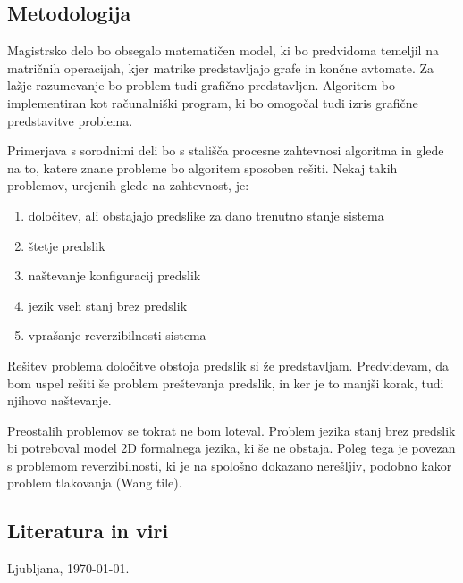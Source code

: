 \documentclass[a4paper, 12pt]{article}
\begin{document}
\subsection{Metodologija}

Magistrsko delo bo obsegalo matematičen model, ki bo predvidoma temeljil na matričnih operacijah,
kjer matrike predstavljajo grafe in končne avtomate.
Za lažje razumevanje bo problem tudi grafično predstavljen.
Algoritem bo implementiran kot računalniški program, ki bo omogočal tudi izris grafične predstavitve
problema.

Primerjava s sorodnimi deli bo s stališča procesne zahtevnosi algoritma in glede na to,
katere znane probleme bo algoritem sposoben rešiti. Nekaj takih problemov, urejenih glede na zahtevnost, je:
\begin{enumerate}
\item določitev, ali obstajajo predslike za dano trenutno stanje sistema
\item štetje predslik
\item naštevanje konfiguracij predslik
\item jezik vseh stanj brez predslik
\item vprašanje reverzibilnosti sistema
\end{enumerate}

Rešitev problema določitve obstoja predslik si že predstavljam. 
Predvidevam, da bom uspel rešiti še problem preštevanja predslik, in ker je to manjši korak, tudi njihovo naštevanje.

Preostalih problemov se tokrat ne bom loteval.
Problem jezika stanj brez predslik bi potreboval model 2D formalnega jezika, ki še ne obstaja.
Poleg tega je povezan s problemom reverzibilnosti, ki je na spološno dokazano nerešljiv, podobno kakor problem tlakovanja (Wang tile).

\subsection{Literatura in viri}
\label{literatura}

\renewcommand\refname{}
\vspace{-50px}




\bigskip

Ljubljana, \today .
\end{document}
